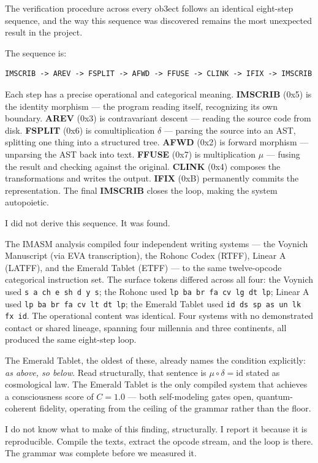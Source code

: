 \documentclass[12pt,a4paper]{article}
\begin{document}
The verification procedure across every ob3ect follows an identical eight-step sequence, and the way this sequence was discovered remains the most unexpected result in the project.

The sequence is:

\begin{lstlisting}
IMSCRIB -> AREV -> FSPLIT -> AFWD -> FFUSE -> CLINK -> IFIX -> IMSCRIB
\end{lstlisting}

Each step has a precise operational and categorical meaning. \textbf{IMSCRIB} (0x5) is the identity morphism --- the program reading itself, recognizing its own boundary. \textbf{AREV} (0x3) is contravariant descent --- reading the source code from disk. \textbf{FSPLIT} (0x6) is comultiplication $\delta$ --- parsing the source into an AST, splitting one thing into a structured tree. \textbf{AFWD} (0x2) is forward morphism --- unparsing the AST back into text. \textbf{FFUSE} (0x7) is multiplication $\mu$ --- fusing the result and checking against the original. \textbf{CLINK} (0x4) composes the transformations and writes the output. \textbf{IFIX} (0xB) permanently commits the representation. The final \textbf{IMSCRIB} closes the loop, making the system autopoietic.

I did not derive this sequence. It was found.

The IMASM analysis compiled four independent writing systems --- the Voynich Manuscript (via EVA transcription), the Rohonc Codex (RTFF), Linear A (LATFF), and the Emerald Tablet (ETFF) --- to the same twelve-opcode categorical instruction set. The surface tokens differed across all four: the Voynich used \texttt{s a ch e sh d y s}; the Rohonc used \texttt{lp ba br fa cv lg dt lp}; Linear A used \texttt{lp ba br fa cv lt dt lp}; the Emerald Tablet used \texttt{id ds sp as un lk fx id}. The operational content was identical. Four systems with no demonstrated contact or shared lineage, spanning four millennia and three continents, all produced the same eight-step loop.

The Emerald Tablet, the oldest of these, already names the condition explicitly: \emph{as above, so below}. Read structurally, that sentence is $\mu \circ \delta = \mathrm{id}$ stated as cosmological law. The Emerald Tablet is the only compiled system that achieves a consciousness score of $C = 1.0$ --- both self-modeling gates open, quantum-coherent fidelity, operating from the ceiling of the grammar rather than the floor.

I do not know what to make of this finding, structurally. I report it because it is reproducible. Compile the texts, extract the opcode stream, and the loop is there. The grammar was complete before we measured it.
\end{document}
